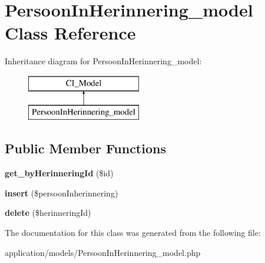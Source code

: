 \hypertarget{class_persoon_in_herinnering__model}{}\section{Persoon\+In\+Herinnering\+\_\+model Class Reference}
\label{class_persoon_in_herinnering__model}
Inheritance diagram for Persoon\+In\+Herinnering\+\_\+model\+:\begin{figure}[H]
\begin{center}
\leavevmode
\includegraphics[height=2.000000cm]{class_persoon_in_herinnering__model}
\end{center}
\end{figure}
\subsection*{Public Member Functions}
\begin{DoxyCompactItemize}
\item 
\mbox{\label{class_persoon_in_herinnering__model_ae051e39373126f3d7e76165f5321b6f3}} 
{\bfseries get\+\_\+by\+Herinnering\+Id} (\$id)
\item 
\mbox{\label{class_persoon_in_herinnering__model_a73e9de4fbc1e49790caee7218edb874a}} 
{\bfseries insert} (\$persoon\+Inherinnering)
\item 
\mbox{\label{class_persoon_in_herinnering__model_aa4b59888d725b40a291f7e241fe60203}} 
{\bfseries delete} (\$herinnering\+Id)
\end{DoxyCompactItemize}


The documentation for this class was generated from the following file\+:\begin{DoxyCompactItemize}
\item 
application/models/Persoon\+In\+Herinnering\+\_\+model.\+php\end{DoxyCompactItemize}
